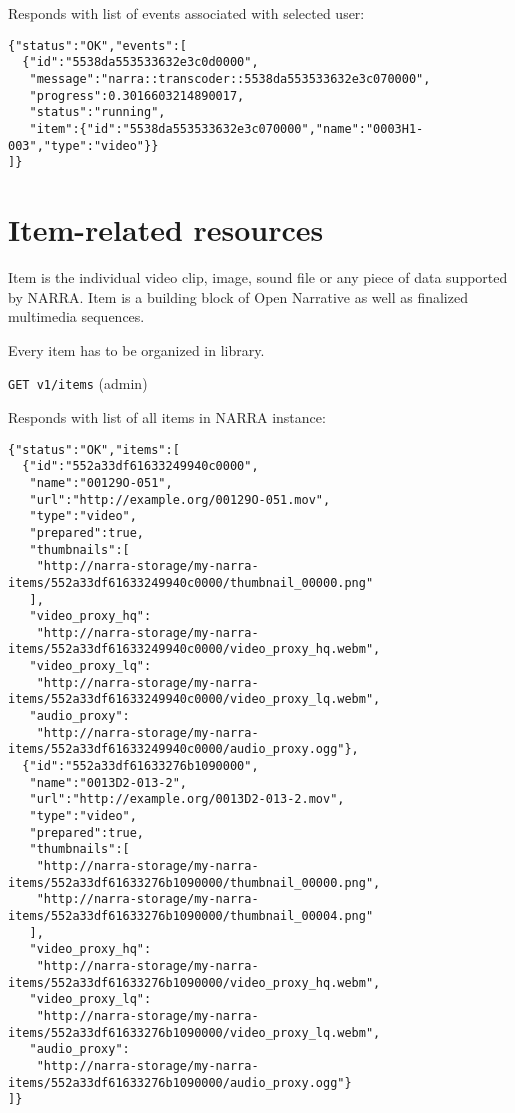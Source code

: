 \documentclass{book}
\newcommand{\request}[2]{{\color{blue}\texttt{#1} (#2)}}
\begin{document}
Responds with list of events associated with selected user:

\begin{verbatim}
{"status":"OK","events":[
  {"id":"5538da553533632e3c0d0000",
   "message":"narra::transcoder::5538da553533632e3c070000",
   "progress":0.3016603214890017,
   "status":"running",
   "item":{"id":"5538da553533632e3c070000","name":"0003H1-003","type":"video"}}
]}
\end{verbatim}


\section{Item-related resources}
Item is the individual video clip, image, sound file or any piece of data supported by NARRA. Item is a building block of Open Narrative as well as finalized multimedia sequences.

Every item has to be organized in library.

\request{GET v1/items}{admin}

Responds with list of all items in NARRA instance:

\begin{verbatim}
{"status":"OK","items":[
  {"id":"552a33df61633249940c0000",
   "name":"00129O-051",
   "url":"http://example.org/00129O-051.mov",
   "type":"video",
   "prepared":true,
   "thumbnails":[
    "http://narra-storage/my-narra-items/552a33df61633249940c0000/thumbnail_00000.png"
   ],
   "video_proxy_hq":
    "http://narra-storage/my-narra-items/552a33df61633249940c0000/video_proxy_hq.webm",
   "video_proxy_lq":
    "http://narra-storage/my-narra-items/552a33df61633249940c0000/video_proxy_lq.webm",
   "audio_proxy":
    "http://narra-storage/my-narra-items/552a33df61633249940c0000/audio_proxy.ogg"},
  {"id":"552a33df61633276b1090000",
   "name":"0013D2-013-2",
   "url":"http://example.org/0013D2-013-2.mov",
   "type":"video",
   "prepared":true,
   "thumbnails":[
    "http://narra-storage/my-narra-items/552a33df61633276b1090000/thumbnail_00000.png",
    "http://narra-storage/my-narra-items/552a33df61633276b1090000/thumbnail_00004.png"
   ],
   "video_proxy_hq":
    "http://narra-storage/my-narra-items/552a33df61633276b1090000/video_proxy_hq.webm",
   "video_proxy_lq":
    "http://narra-storage/my-narra-items/552a33df61633276b1090000/video_proxy_lq.webm",
   "audio_proxy":
    "http://narra-storage/my-narra-items/552a33df61633276b1090000/audio_proxy.ogg"}
]}

\end{verbatim}
\end{document}
